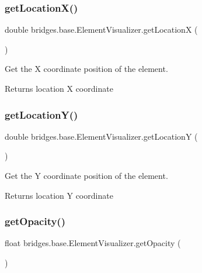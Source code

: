 \subsubsection{\texorpdfstring{get\+Location\+X()}{getLocationX()}}
{\footnotesize\ttfamily double bridges.\+base.\+Element\+Visualizer.\+get\+LocationX (\begin{DoxyParamCaption}{ }\end{DoxyParamCaption})}



Get the X coordinate position of the element. 

\begin{DoxyReturn}{Returns}
location X coordinate 
\end{DoxyReturn}
\mbox{\label{classbridges_1_1base_1_1_element_visualizer_ac170e945106f43cac3a3bdd950c60235}} 
\subsubsection{\texorpdfstring{get\+Location\+Y()}{getLocationY()}}
{\footnotesize\ttfamily double bridges.\+base.\+Element\+Visualizer.\+get\+LocationY (\begin{DoxyParamCaption}{ }\end{DoxyParamCaption})}



Get the Y coordinate position of the element. 

\begin{DoxyReturn}{Returns}
location Y coordinate 
\end{DoxyReturn}
\mbox{\label{classbridges_1_1base_1_1_element_visualizer_ab86ff39f17f8d1766670b18be88b5492}} 
\subsubsection{\texorpdfstring{get\+Opacity()}{getOpacity()}}
{\footnotesize\ttfamily float bridges.\+base.\+Element\+Visualizer.\+get\+Opacity (\begin{DoxyParamCaption}{ }\end{DoxyParamCaption})}



